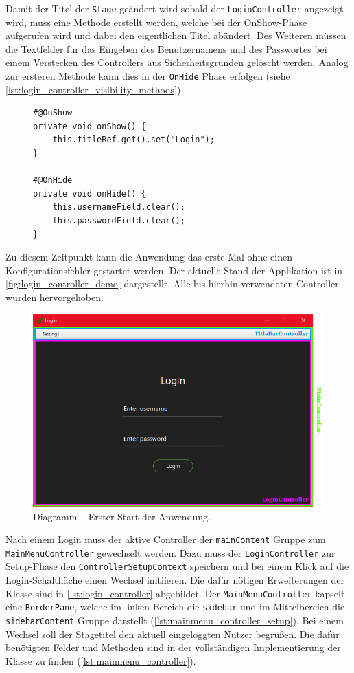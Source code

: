 \noindent Damit der Titel der \texttt{Stage} geändert wird sobald der \texttt{LoginController} angezeigt wird, muss eine Methode erstellt werden, welche bei der OnShow-Phase aufgerufen wird und dabei den eigentlichen Titel abändert. Des Weiteren müssen die Textfelder für das Eingeben des Benutzernamens und des Passwortes bei einem Verstecken des Controllers aus Sicherheitsgründen gelöscht werden. Analog zur ersteren Methode kann dies in der \texttt{OnHide} Phase erfolgen (siehe \autoref{lst:login_controller_visibility_methods}).
\begin{figure}[H]
	\begin{lstlisting}[caption=Demo -- OnShow und OnHide Methoden, captionpos=b, label=lst:login_controller_visibility_methods]
#@OnShow
private void onShow() {
    this.titleRef.get().set("Login");
}

#@OnHide
private void onHide() {
    this.usernameField.clear();
    this.passwordField.clear();
}
	\end{lstlisting}
\end{figure}
\noindent Zu diesem Zeitpunkt kann die Anwendung das erste Mal ohne einen Konfigurationsfehler gestartet werden. Der aktuelle Stand der Applikation ist in \autoref{fig:login_controller_demo} dargestellt. Alle bis hierhin verwendeten Controller wurden hervorgehoben.
\begin{figure}[H]
	\centering
	\includegraphics[width=\textwidth]{Abbildungen/Login Screen.png}
	\caption{Diagramm -- Erster Start der Anwendung.}
	\label{fig:login_controller_demo}
\end{figure}
\noindent Nach einem Login muss der aktive Controller der \texttt{mainContent} Gruppe zum \texttt{MainMenuController} gewechselt werden. Dazu muss der \texttt{LoginController} zur Setup-Phase den \texttt{ControllerSetupContext} speichern und bei einem Klick auf die Login-Schaltfläche einen Wechsel initiieren. Die dafür nötigen Erweiterungen der Klasse sind in \autoref{lst:login_controller} abgebildet. Der \texttt{MainMenuController} kapselt eine \texttt{BorderPane}, welche im linken Bereich die \texttt{sidebar} und im Mittelbereich die \texttt{sidebarContent} Gruppe darstellt (\autoref{lst:mainmenu_controller_setup}). Bei einem Wechsel soll der Stagetitel den aktuell eingeloggten Nutzer begrüßen. Die dafür benötigten Felder und Methoden sind in der vollständigen Implementierung der Klasse zu finden (\autoref{lst:mainmenu_controller}).
